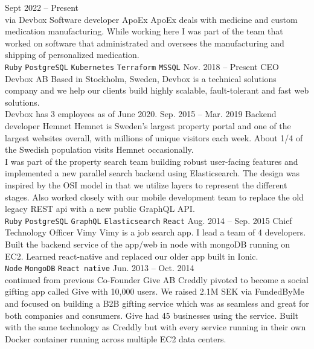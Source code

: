 \documentclass[9pt]{template} %
\begin{document}
\begin{entrylist}
  \entry
    {Sept 2022 -- Present\\\footnotesize{via Devbox}}
    {Software developer}
    {ApoEx}
    {ApoEx deals with medicine and custom medication manufacturing. While working here I was part of the team that worked on software that administrated and oversees the manufacturing and shipping of personalized medication.\\
      \texttt{Ruby}\slashsep
      \texttt{PostgreSQL}\slashsep
      \texttt{Kubernetes}\slashsep
      \texttt{Terraform}\slashsep
      \texttt{MSSQL}
    }
  \entry
    {Nov. 2018 -- Present}
    {CEO}
    {Devbox AB}
    {Based in Stockholm, Sweden, Devbox is a technical solutions company and we help our clients build highly scalable, fault-tolerant and fast web solutions.\\
     Devbox has 3 employees as of June 2020.}
  \entry
    {Sep. 2015 -- Mar. 2019}
    {Backend developer}
    {Hemnet}
    {Hemnet is Sweden’s largest property portal and one of the largest websites overall, with millions of unique visitors each week. About 1/4 of the Swedish population visits Hemnet occasionally.\\
      I was part of the property search team building robust user-facing features and implemented a new parallel search backend using Elasticsearch. The design was inspired by the OSI model in that we utilize layers to represent the different stages. Also worked closely with our mobile development team to replace the old legacy REST api with a new public GraphQL API.\\
      \texttt{Ruby}\slashsep
      \texttt{PostgreSQL}\slashsep
      \texttt{GraphQL}\slashsep
      \texttt{Elasticsearch}\slashsep
      \texttt{React}
    }
  \entry
    {Aug. 2014 -- Sep. 2015}
    {Chief Technology Officer}
    {Vimy}
    {Vimy is a job search app. I lead a team of 4 developers. Built the backend service of the app/web in node with mongoDB running on EC2. Learned react-native and replaced our older app built in Ionic.\\
      \texttt{Node}\slashsep
      \texttt{MongoDB}\slashsep
      \texttt{React native}
    }
  \entry
    {Jun. 2013 – Oct. 2014\\\footnotesize{continued from previous}}
    {Co-Founder}
    {Give AB}
    {Creddly pivoted to become a social gifting app called Give with 10,000 users. We raised 2.1M SEK via FundedByMe and focused on building a B2B gifting service which was as seamless and great for both companies and consumers. Give had 45 businesses using the service. Built with the same technology as Creddly but with every service running in their own Docker container running across multiple EC2 data centers.\\
}
\end{entrylist}
\end{document}
